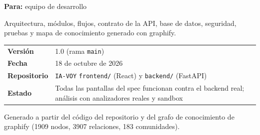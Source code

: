 \documentclass[11pt,a4paper]{article}
\newcommand{\code}[1]{\texttt{\small #1}}
\newcommand{\ruta}[1]{\texttt{\small\color{branddark}#1}}
\newcommand{\flecha}{\textrightarrow{}}
\begin{document}
\sloppy

\begin{titlepage}
\thispagestyle{empty}

\vspace*{10.5cm}

{\large\color{ink}\textbf{Para:} equipo de desarrollo}\par\vspace{4pt}
{\color{muted}Arquitectura, módulos, flujos, contrato de la API, base de datos, seguridad, pruebas y mapa de conocimiento generado con graphify.}

\vspace{1.2cm}
\begin{tabularx}{\linewidth}{@{}lL@{}}
\textbf{Versión}   & 1.0 (rama \code{main}) \\
\textbf{Fecha}     & 18 de octubre de 2026 \\
\textbf{Repositorio} & \code{IA-VOY} \flecha{} \code{frontend/} (React) y \code{backend/} (FastAPI) \\
\textbf{Estado}    & Todas las pantallas del spec funcionan contra el backend real; análisis con analizadores reales y sandbox \\
\end{tabularx}

\vfill
{\small\color{muted}Generado a partir del código del repositorio y del grafo de conocimiento de graphify (1909 nodos, 3907 relaciones, 183 comunidades).}
\end{titlepage}

\tableofcontents
\newpage
\end{document}
